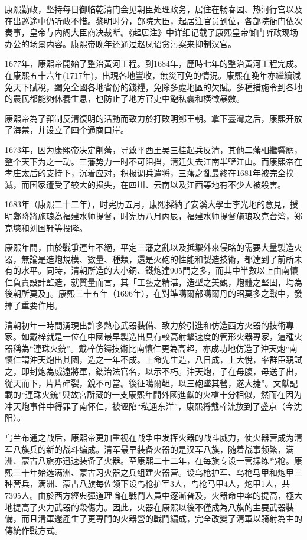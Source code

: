 康熙勤政，坚持每日御临乾清门会见朝臣处理政务，居住在畅春园、热河行宫以及在出巡途中仍听政不惜。黎明时分，部院大臣，起居注官员到位，各部院衙门依次奏事，皇帝与内阁大臣商决裁断。《起居注》中详细记载了康熙皇帝御门听政现场办公的场景内容。康熙帝晚年还通过赵凤诏贪污案来抑制汉官。

1677年，康熙帝開始了整治黃河工程。到1684年，歷時七年的整治黃河工程完成。在康熙五十六年(1717年)，出現各地豐收，無災可免的情況。康熙在晚年亦繼續減免天下賦稅，蠲免全國各地省份的錢糧，免除多處地區的欠賦。多種措施令到各地的農民都能夠休養生息，也防止了地方官吏中飽私囊和橫徵暴斂。

康熙帝為了箝制反清復明的活動而致力於打敗明鄭王朝。拿下臺灣之后，康熙开放了海禁，并设立了四个通商口岸。

1673年，因为康熙帝决定削藩，导致平西王吴三桂起兵反清，其他二藩相繼響應，整个天下为之一动。三藩势力一时不可阻挡，清廷失去江南半壁江山。而康熙帝在孝庄太后的支持下，沉着应对，积极调兵遣将，三藩之亂最終在1681年被完全撲滅，而国家遭受了较大的损失，在四川、云南以及江西等地有不少人被殺害。

1683年（康熙二十二年），时宪历五月，康熙採納了安溪大學士李光地的意見，授明鄭降將施琅為福建水师提督，时宪历八月丙辰，福建水师提督施琅攻克台湾，郑克塽和刘国轩等投降。

康熙年間，由於戰爭連年不絕，平定三藩之亂以及抵禦外來侵略的需要大量製造火器，無論是造炮規模、數量、種類，還是火砲的性能和製造技術，都達到了前所未有的水平。同時，清朝所造的大小銅、鐵炮達905門之多，而其中半數以上由南懷仁負責設計監造，就質量而言，其「工藝之精湛，造型之美觀，炮體之堅固，均為後朝所莫及」。康熙三十五年（1696年），在對準噶爾部噶爾丹的昭莫多之戰中，發揮了重要作用。

清朝初年一時間湧現出許多熱心武器裝備、致力於引進和仿造西方火器的技術專家。如戴梓就是一位在中國最早製造出具有較高射擊速度的管形火器專家，這種火器稱為“連珠火銃”。戴梓仿鑄技術比南懷仁更為高超，亦成功地仿造了沖天炮“南懷仁謂沖天炮出其國，造之一年不成。上命先生造，八日成，上大悅，率群臣親試之，即封炮為威遠將軍，鐫治法官名，以示不朽。沖天炮，子在母腹，母送子出，從天而下，片片碎裂，銳不可當。後征噶爾靼，以三砲墜其營，遂大捷”。文獻記載的“連珠火銃”與故宮所藏的一支康熙年間外國進獻的火槍十分相似，然而在因为冲天炮事件中得罪了南怀仁，被诬陷“私通东洋”，康熙将戴梓流放到了盛京（今沈阳）。

乌兰布通之战后，康熙帝更加重视在战争中发挥火器的战斗威力，使火器营成为清军八旗兵的新的战斗编成。清军最早装备火器的是汉军八旗，随着战事频繁，满洲、蒙古八旗亦迅速装备了火器。至康熙二十二年，在每旗专设一营操练鸟枪。康熙三十年始选满洲、蒙古习火器之兵组建火器营。设鸟枪护军、鸟枪马甲和炮甲三种营兵，满洲、蒙古八旗每佐领下设鸟枪护军3人，鸟枪马甲4人，炮甲1人，共7395人。由於西方經典彈道理論在戰鬥人員中逐漸普及，火器命中率的提高，極大地提高了火力武器的殺傷力。因此，火器在康熙以後不僅成為八旗的主要武器裝備，而且清軍還產生了更專門的火器營的戰鬥編成，完全改變了清軍以騎射為主的傳統作戰方式。

